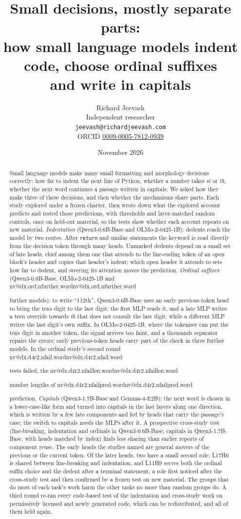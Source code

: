 \documentclass[11pt]{article}
\title{\textbf{Small decisions, mostly separate parts:\\ how small language models indent code, choose ordinal suffixes\\ and write in capitals}}
\author{Richard Jeevash\\ Independent researcher\\ \texttt{jeevash@richardjeevash.com}\\ ORCID \href{https://orcid.org/0009-0005-7812-0939}{0009-0005-7812-0939}}
\date{November 2026}
\makeatletter
\newcommand{\nv}[1]{\ifcsname nv@#1\endcsname\csname nv@#1\endcsname\else\PackageError{numbers}{Unknown number key #1}{}\fi}
\newcommand{\hd}[2]{L#1H#2}
\newcommand{\code}[1]{\texttt{#1}}
\newcommand{\sfx}[1]{\textit{#1}}
\newcommand{\qsix}{Qwen3-0.6B-Base}
\newcommand{\qbig}{Qwen3-1.7B-Base}
\newcommand{\olmo}{OLMo-2-0425-1B}
\newcommand{\gm}{Gemma-4-E2B}
\makeatother
\begin{document}
\maketitle
\vspace{-2em}

\begin{abstract}
\noindent
Small language models make many small formatting and morphology decisions correctly: how far to indent the next line of Python, whether a number takes \sfx{st} or \sfx{th}, whether the next word continues a passage written in capitals. We asked how they make three of these decisions, and then whether the mechanisms share parts. Each study explored under a frozen charter, then wrote down what the explored account predicts and tested those predictions, with thresholds and layer-matched random controls, once on held-out material, so the tests show whether each account repeats on new material. \emph{Indentation} (\qsix{} and \olmo{}): dedents reach the model by two routes. After \code{return} and similar statements the keyword is read directly from the decision token through many heads. Unmarked dedents depend on a small set of late heads, chief among them one that attends to the line-ending token of an open block's header and copies that header's indent; which open header it attends to sets how far to dedent, and steering its attention moves the prediction. \emph{Ordinal suffixes} (\qsix{}, \olmo{} and \nv{dx.ord.nfurther.word} further models): to write ``112th'', \qsix{} uses an early previous-token head to bring the tens digit to the last digit; the first MLP reads it, and a late MLP writes a teen override towards \sfx{th} that does not consult the last digit, while a different MLP writes the last digit's own suffix. In \olmo{}, where the tokeniser can put the tens digit in another token, the signal arrives too faint, and a thousands separator repairs the errors; early previous-token heads carry part of the check in three further models. In the ordinal study's second round \nv{dx.d4r2.nfail.word} tests failed, the \nv{dx.d4r2.nfaillen.word} number lengths of \nv{dx.d4r2.nfailpred.word} prediction. \emph{Capitals} (\qbig{} and \gm{}): the next word is chosen in a lower-case-like form and turned into capitals in the last layers along one direction, which is written by a few late components and fed by heads that carry the passage's case; the switch to capitals needs the MLPs after it. A prospective cross-study test (line-breaking, indentation and ordinals in \qsix{}; capitals in \qbig{}, with heads matched by index) finds less sharing than earlier reports of component reuse. The early heads the studies named are general movers of the previous or the current token. Of the later heads, two have a small second role: \hd{17}{6} is shared between line-breaking and indentation, and \hd{11}{9} serves both the ordinal suffix choice and the dedent after a terminal statement, a role first noticed after the cross-study test and then confirmed by a frozen test on new material. The groups that do most of each task's work harm the other tasks no more than random groups do. A third round re-ran every code-based test of the indentation and cross-study work on permissively licensed and newly generated code, which can be redistributed, and all of them held again.

\end{abstract}
\end{document}
